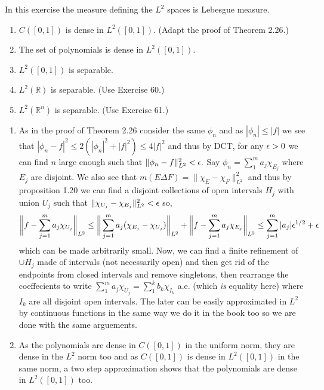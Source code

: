 \documentclass[12pt,a4paper]{article}
\begin{document}
\begin{problem}\label{prob:5-62}
In this exercise the measure defining the $L^2$ spaces is Lebesgue measure.
\begin{enumerate}[label=\alph*.]
\item $C([0,1])$ is dense in $L^2([0,1])$. (Adapt the proof of Theorem 2.26.)
\item The set of polynomials is dense in $L^2([0,1])$.
\item $L^2([0,1])$ is separable.
\item $L^2(\mathbb{R})$ is separable. (Use Exercise 60.)
\item $L^2(\mathbb{R}^n)$ is separable. (Use Exercise 61.)
\end{enumerate}
\end{problem}
\begin{solution}
    \begin{enumerate}[label=\alph*.]
        \item As in the proof of Theorem 2.26 consider the same $\phi_n$ and as $|\phi_n|\leq|f|$ we see that $|\phi_n-f|^2\leq 2(|\phi_n|^2+|f|^2)\leq4|f|^2$ and thus by DCT, for any $\epsilon>0$ we can find $n$ large enough such that $\|\phi_n-f\|_{L^2}^2<\epsilon.$ 
            Say $\phi_n=\sum_1^ma_j\chi_{E_j}$ where $E_j$ are disjoint. 
             We also see that $m(E\Delta F)=\|\chi_E-\chi_F\|_{L^2}^2$ and thus by proposition 1.20 we can find a disjoint collections of open intervals $H_j$ with union $U_j$ such that $\|\chi_{U_j}-\chi_{E_j}\|_{L^2}^2<\epsilon$ so, 
            \[
                \bigg\|f-\sum_{j=1}^ma_j\chi_{U_j}\bigg\|_{L^2}\leq \bigg\|\sum_{j=1}^ma_j(\chi_{E_j}-\chi_{U_j})\bigg\|_{L^2}+ \bigg\|f-\sum_{j=1}^ma_j\chi_{E_j}\bigg\|_{L^2}\leq\sum_{j=1}^m|a_j|\epsilon^{1/2}+\epsilon
            \]
            which can be made arbitrarily small. 
            Now, we can find a finite refinement of $\cup H_j$ made of intervals (not necessarily open) and then get rid of the endpoints from closed intervals and remove singletons, then rearrange the coeffecients to write $\sum_1^ma_j\chi_{U_j}=\sum_1^kb_k\chi_{I_k}$ a.e. (which \textit{is} equality here) where $I_k$ are all disjoint open intervals. 
            The later can be easily approximated in $L^2$ by continuous functions in the same way we do it in the book too so we are done with the same arguements. 
        \item As the polynomials are dense in $C([0,1])$ in the uniform norm, they are dense in the $L^2$ norm too and as $C([0,1])$ is dense in $L^2([0,1])$ in the same norm, a two step approximation shows that the polynomials are dense in $L^2([0,1])$ too. 

\end{enumerate}
\end{solution}
\end{document}
